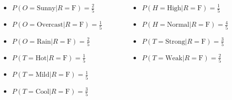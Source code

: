 \documentclass[aspectratio=169, 10pt]{beamer}
\begin{document}
\begin{frame}[t]
    \begin{columns}
        \begin{column}{0.5\textwidth}
           \begin{itemize}
               \item $P(O=\text{Sunny} | R=\text{F}) = \frac{2}{5}$
               \item $P(O=\text{Overcast} | R=\text{F}) = \frac{1}{5}$
               \item $P(O=\text{Rain} | R=\text{F}) = \frac{2}{5}$
           \end{itemize}
           \vspace{0.5em}
           \begin{itemize}
            \item $P(T=\text{Hot} | R=\text{F}) = \frac{1}{5}$
            \item $P(T=\text{Mild} | R=\text{F}) = \frac{1}{5}$
            \item $P(T=\text{Cool} | R=\text{F}) = \frac{3}{5}$
        \end{itemize}
        \end{column}
        \begin{column}{0.5\textwidth}  %
            \begin{itemize}
                \item $P(H=\text{High} | R=\text{F}) = \frac{1}{5}$
                \item $P(H=\text{Normal} | R=\text{F}) = \frac{4}{5}$
            \end{itemize}
            \vspace{0.5em}
            \begin{itemize}
                \item $P(T=\text{Strong} | R=\text{F}) = \frac{3}{5}$
                \item $P(T=\text{Weak} | R=\text{F}) = \frac{2}{5}$
            \end{itemize}        
        \end{column}
    \end{columns}
\end{frame}
\end{document}
